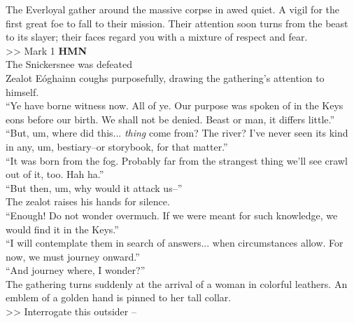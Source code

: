 The Everloyal gather around the massive corpse in awed quiet. A vigil for the first great foe to fall to their mission. Their attention soon turns from the beast to its slayer; their faces regard you with a mixture of respect and fear.\\
>> Mark 1 \textbf{HMN}\\
 The Snickersnee was defeated\\

Zealot Eóghainn coughs purposefully, drawing the gathering’s attention to himself.\\

“Ye have borne witness now. All of ye. Our purpose was spoken of in the Keys eons before our birth. We shall not be denied. Beast or man, it differs little.”\\

“But, um, where did this... \emph{thing} come from? The river? I’ve never seen its kind in any, um, bestiary--or storybook, for that matter.”\\

“It was born from the fog. Probably far from the strangest thing we’ll see crawl out of it, too. Hah ha.”\\

“But then, um, why would it attack us--”\\

The zealot raises his hands for silence.\\
“Enough! Do not wonder overmuch. If we were meant for such knowledge, we would find it in the Keys.”\\

“I will contemplate them in search of answers... when circumstances allow. For now, we must journey onward.”\\

“And journey where, I wonder?”\\

The gathering turns suddenly at the arrival of a woman in colorful leathers. An emblem of a golden hand is pinned to her tall collar.\\

>> Interrogate this outsider -- 